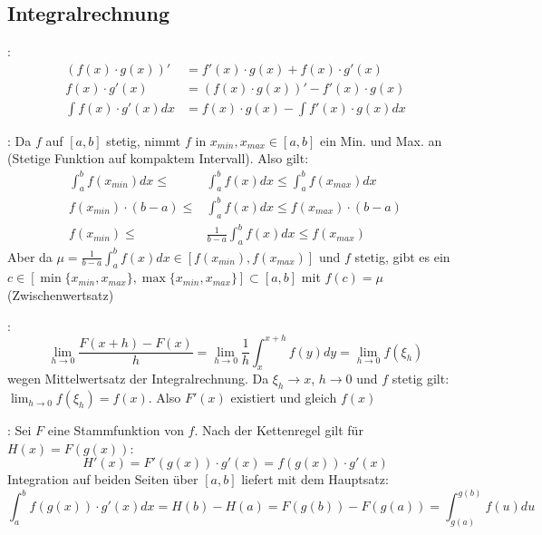 \subsection{Integralrechnung}

\Bew {}:
\begin{align*}
    (f(x) \cdot g(x))' &= f'(x)\cdot g(x) + f(x) \cdot g'(x) \\[-0.6em]
    f(x) \cdot g'(x) &= (f(x) \cdot g(x))' - f'(x) \cdot g(x) \\[-0.6em]
    \int f(x) \cdot g'(x) dx &= f(x) \cdot g(x) - \int f'(x) \cdot g(x) dx
\end{align*}

\begin{minipage}{\linewidth}
\Bew {}: Da $f$ auf $[a, b]$ stetig, nimmt $f$ in $x_{min}, x_{max} \in [a, b]$
ein Min. und Max. an (Stetige Funktion auf kompaktem Intervall). Also gilt:
\vspace{-0.2em}
\begin{align*}
    \int_a^b f(x_{min}) dx \le &\int_a^b f(x) dx \le \int_a^b f(x_{max}) dx \\[-0.2em]
    f(x_{min}) \cdot (b-a) \le &\int_a^b f(x) dx \le f(x_{max}) \cdot (b-a) \\[-0.2em]
    f(x_{min}) \le &\frac{1}{b-a}\int_a^b f(x) dx \le f(x_{max})
\end{align*}
Aber da $\mu = \displaystyle\frac{1}{b-a}\int_a^b f(x) dx \in [f(x_{min}), f(x_{max})]$ und $f$ stetig,
gibt es ein $c \in [\min\{x_{min}, x_{max}\}, \max\{x_{min}, x_{max}\}] \subset [a, b]$ mit $f(c) = \mu$ (Zwischenwertsatz)
\end{minipage}

\begin{minipage}{\linewidth}
\Bew {}:
$$\lim_{h\to 0} \frac{F(x + h) - F(x)}{h} = \lim_{h\to 0} \frac{1}{h} \int_{x}^{x + h} f(y) dy = \lim_{h\to 0} f(\xi_h)$$
wegen Mittelwertsatz der Integralrechnung. Da $\xi_h \to x$, $h \to 0$ und $f$ stetig gilt:
$\lim_{h\to 0} f(\xi_h) = f(x)$. Also $F'(x)$ existiert und gleich $f(x)$
\end{minipage}

\Bew {}: Sei $F$ eine Stammfunktion von $f$. Nach der Kettenregel gilt für $H(x) = F(g(x))$:
$$H'(x) = F'(g(x)) \cdot g'(x) = f(g(x)) \cdot g'(x)$$
Integration auf beiden Seiten über $[a, b]$ liefert mit dem Hauptsatz:
$$\int_a^b f(g(x)) \cdot g'(x) dx = H(b) - H(a) = F(g(b)) - F(g(a)) = \int_{g(a)}^{g(b)} f(u) du$$
